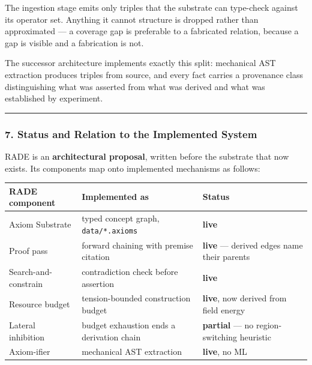 \documentclass[
  11pt,
  a4paper,
]{article}
\begin{document}
The ingestion stage emits only triples that the substrate can type-check
against its operator set. Anything it cannot structure is dropped rather
than approximated --- a coverage gap is preferable to a fabricated
relation, because a gap is visible and a fabrication is not.

The successor architecture implements exactly this split: mechanical AST
extraction produces triples from source, and every fact carries a
provenance class distinguishing what was asserted from what was derived
and what was established by experiment.

\begin{center}\rule{0.5\linewidth}{0.5pt}\end{center}

\subsubsection{7. Status and Relation to the Implemented
System}\label{status-and-relation-to-the-implemented-system}

RADE is an \textbf{architectural proposal}, written before the substrate
that now exists. Its components map onto implemented mechanisms as
follows:

\begin{longtable}[]{@{}
  >{\raggedright\arraybackslash}p{}
  >{\raggedright\arraybackslash}p{}
  >{\raggedright\arraybackslash}p{}@{}}
\toprule\noalign{}
\begin{minipage}[b]{\linewidth}\raggedright
RADE component
\end{minipage} & \begin{minipage}[b]{\linewidth}\raggedright
Implemented as
\end{minipage} & \begin{minipage}[b]{\linewidth}\raggedright
Status
\end{minipage} \\
\midrule\noalign{}
\endhead
\bottomrule\noalign{}
\endlastfoot
Axiom Substrate & typed concept graph, \texttt{data/*.axioms} &
\textbf{live} \\
Proof pass & forward chaining with premise citation & \textbf{live} ---
derived edges name their parents \\
Search-and-constrain & contradiction check before assertion &
\textbf{live} \\
Resource budget & tension-bounded construction budget & \textbf{live},
now derived from field energy \\
Lateral inhibition & budget exhaustion ends a derivation chain &
\textbf{partial} --- no region-switching heuristic \\
Axiom-ifier & mechanical AST extraction & \textbf{live}, no ML \\
\end{longtable}
\end{document}
